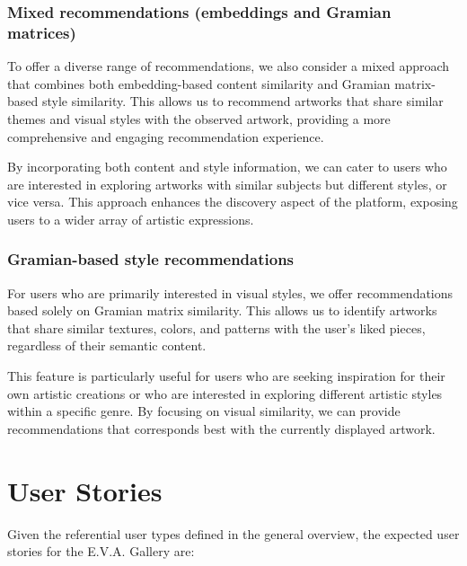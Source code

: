 \subsection{Mixed recommendations (embeddings and Gramian matrices)}
To offer a diverse range of recommendations, we also consider a mixed approach that combines both embedding-based content similarity and Gramian matrix-based style similarity. This allows us to recommend artworks that share similar themes and visual styles with the observed artwork, providing a more comprehensive and engaging recommendation experience.

By incorporating both content and style information, we can cater to users who are interested in exploring artworks with similar subjects but different styles, or vice versa. This approach enhances the discovery aspect of the platform, exposing users to a wider array of artistic expressions.

\subsection{Gramian-based style recommendations}
For users who are primarily interested in visual styles, we offer recommendations based solely on Gramian matrix similarity. This allows us to identify artworks that share similar textures, colors, and patterns with the user's liked pieces, regardless of their semantic content.

This feature is particularly useful for users who are seeking inspiration for their own artistic creations or who are interested in exploring different artistic styles within a specific genre. By focusing on visual similarity, we can provide recommendations that corresponds best with the currently displayed artwork.

\chapter{User Stories}
Given the referential user types defined in the general overview, the expected user stories for the E.V.A. Gallery are:

